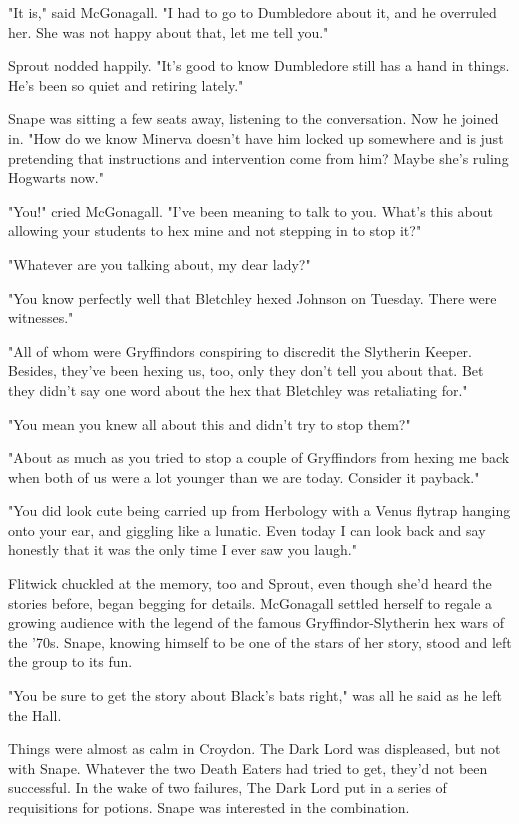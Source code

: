 \documentclass[a4paper,11pt]{article}
\begin{document}
"It is," said McGonagall. "I had to go to Dumbledore about it, and he overruled her. She was not happy about that, let me tell you."

Sprout nodded happily. "It's good to know Dumbledore still has a hand in things. He's been so quiet and retiring lately."

Snape was sitting a few seats away, listening to the conversation. Now he joined in. "How do we know Minerva doesn't have him locked up somewhere and is just pretending that instructions and intervention come from him? Maybe she's ruling Hogwarts now."

"You!" cried McGonagall. "I've been meaning to talk to you. What's this about allowing your students to hex mine and not stepping in to stop it?"

"Whatever are you talking about, my dear lady?"

"You know perfectly well that Bletchley hexed Johnson on Tuesday. There were witnesses."

"All of whom were Gryffindors conspiring to discredit the Slytherin Keeper. Besides, they've been hexing us, too, only they don't tell you about that. Bet they didn't say one word about the hex that Bletchley was retaliating for."

"You mean you knew all about this and didn't try to stop them?"

"About as much as you tried to stop a couple of Gryffindors from hexing me back when both of us were a lot younger than we are today. Consider it payback."

"You did look cute being carried up from Herbology with a Venus flytrap hanging onto your ear, and giggling like a lunatic. Even today I can look back and say honestly that it was the only time I ever saw you laugh."

Flitwick chuckled at the memory, too and Sprout, even though she'd heard the stories before, began begging for details. McGonagall settled herself to regale a growing audience with the legend of the famous Gryffindor-Slytherin hex wars of the '70s. Snape, knowing himself to be one of the stars of her story, stood and left the group to its fun.

"You be sure to get the story about Black's bats right," was all he said as he left the Hall.

Things were almost as calm in Croydon. The Dark Lord was displeased, but not with Snape. Whatever the two Death Eaters had tried to get, they'd not been successful. In the wake of two failures, The Dark Lord put in a series of requisitions for potions. Snape was interested in the combination.
\end{document}
